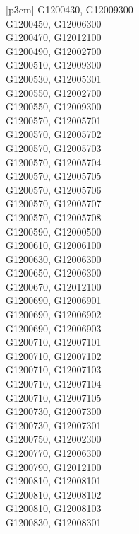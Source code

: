 \begin{customLongTable}{ |p{3cm}| }
G1200430, G12009300 \\ \hline
G1200450, G12006300 \\ \hline
G1200470, G12012100 \\ \hline
G1200490, G12002700 \\ \hline
G1200510, G12009300 \\ \hline
G1200530, G12005301 \\ \hline
G1200550, G12002700 \\ \hline
G1200550, G12009300 \\ \hline
G1200570, G12005701 \\ \hline
G1200570, G12005702 \\ \hline
G1200570, G12005703 \\ \hline
G1200570, G12005704 \\ \hline
G1200570, G12005705 \\ \hline
G1200570, G12005706 \\ \hline
G1200570, G12005707 \\ \hline
G1200570, G12005708 \\ \hline
G1200590, G12000500 \\ \hline
G1200610, G12006100 \\ \hline
G1200630, G12006300 \\ \hline
G1200650, G12006300 \\ \hline
G1200670, G12012100 \\ \hline
G1200690, G12006901 \\ \hline
G1200690, G12006902 \\ \hline
G1200690, G12006903 \\ \hline
G1200710, G12007101 \\ \hline
G1200710, G12007102 \\ \hline
G1200710, G12007103 \\ \hline
G1200710, G12007104 \\ \hline
G1200710, G12007105 \\ \hline
G1200730, G12007300 \\ \hline
G1200730, G12007301 \\ \hline
G1200750, G12002300 \\ \hline
G1200770, G12006300 \\ \hline
G1200790, G12012100 \\ \hline
G1200810, G12008101 \\ \hline
G1200810, G12008102 \\ \hline
G1200810, G12008103 \\ \hline
G1200830, G12008301 \\ \hline

\end{customLongTable}
